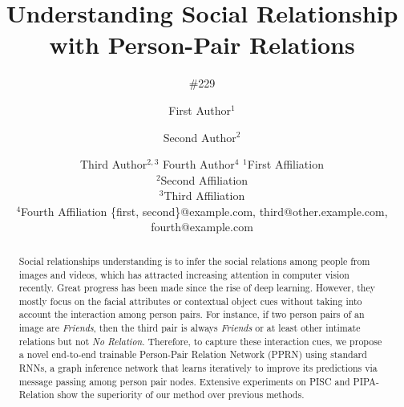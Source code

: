 \documentclass{article}
\title{Understanding Social Relationship with Person-Pair Relations}
\author{
    \#229
}
\author{
First Author$^1$
\and
Second Author$^2$\and
Third Author$^{2,3}$\And
Fourth Author$^4$
\affiliations
$^1$First Affiliation\\
$^2$Second Affiliation\\
$^3$Third Affiliation\\
$^4$Fourth Affiliation
\emails
\{first, second\}@example.com,
third@other.example.com,
fourth@example.com
}
\newcommand{\PPRN}{{\sf PPRN}}
\begin{document}
\maketitle

\begin{abstract}
Social relationships understanding is to infer the social relations among people from images and videos, which has attracted increasing attention in computer vision recently. Great progress has been made since the rise of deep learning. However, they mostly focus on the facial attributes or contextual object cues without taking into account the interaction among person pairs. 
For instance, if two person pairs of an image are {\it Friends}, then the third pair is always {\it Friends} or at least other intimate relations but not {\it No Relation}. Therefore, to capture these interaction cues, we propose a novel end-to-end trainable Person-Pair Relation Network (\PPRN) using standard RNNs, a graph inference network that learns iteratively to improve its predictions via message passing among person pair nodes. Extensive experiments on PISC and PIPA-Relation show the superiority of our method over previous methods.

\end{abstract}
\end{document}
